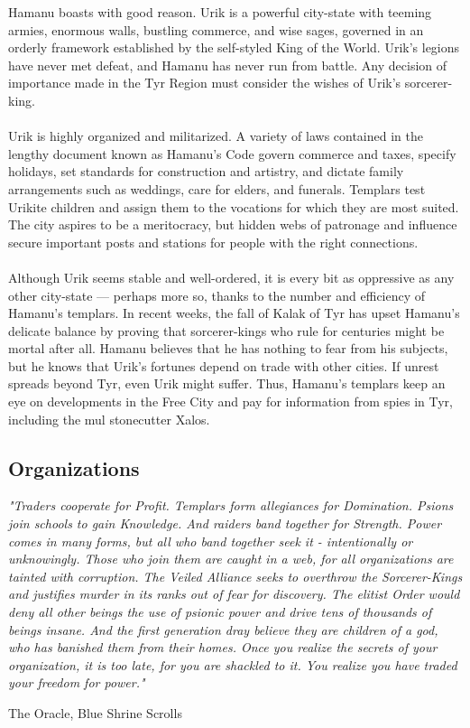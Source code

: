 \begin{multicols}{2}
Hamanu boasts with good reason. Urik is a powerful
city-state with teeming armies, enormous walls,
bustling commerce, and wise sages, governed in an
orderly framework established by the self-styled King
of the World. Urik's legions have never met defeat,
and Hamanu has never run from battle. Any decision
of importance made in the Tyr Region must consider
the wishes of Urik’s sorcerer-king.\\
\\
Urik is highly organized and militarized. A variety
of laws contained in the lengthy document known as
Hamanu's Code govern commerce and taxes, specify
holidays, set standards for construction and artistry,
and dictate family arrangements such as weddings,
care for elders, and funerals. Templars test Urikite
children and assign them to the vocations for which
they are most suited. The city aspires to be a meritocracy,
but hidden webs of patronage and influence
secure important posts and stations for people with
the right connections.\\
\\
Although Urik seems stable and well-ordered, it
is every bit as oppressive as any other city-state — perhaps
more so, thanks to the number and efficiency
of Hamanu's templars. In recent weeks, the fall of
Kalak of Tyr has upset Hamanu's delicate balance by
proving that sorcerer-kings who rule for centuries
might be mortal after all. Hamanu believes that he
has nothing to fear from his subjects, but he knows
that Urik's fortunes depend on trade with other cities.
If unrest spreads beyond Tyr, even Urik might suffer.
Thus, Hamanu’s templars keep an eye on developments
in the Free City and pay for information from
spies in Tyr, including the mul stonecutter Xalos.\\

\end{multicols}

\hrulefill

\subsection{Organizations}

\epigraph{\textit{
"Traders cooperate for Profit. Templars form allegiances
for Domination. Psions join schools to gain Knowledge.
And raiders band together for Strength. Power comes in
many forms, but all who band together seek it - intentionally
or unknowingly. Those who join them are caught in a web, for
all organizations are tainted with corruption. The Veiled
Alliance seeks to overthrow the Sorcerer-Kings and justifies
murder in its ranks out of fear for discovery. The elitist
Order would deny all other beings the use of psionic power
and drive tens of thousands of beings insane. And the first
generation dray believe they are children of a god, who has
banished them from their homes. Once you realize the secrets
of your organization, it is too late, for you are shackled
to it. You realize you have traded your freedom for power." } }
{ The Oracle, Blue Shrine Scrolls }

